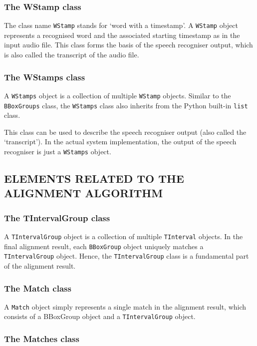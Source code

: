 \documentclass[12pt]{article}
\begin{document}
\subsubsection{The WStamp class}

The class name \texttt{WStamp} stands for `word with a timestamp'. A \texttt{WStamp} object represents a recognised word and the associated starting timestamp as in the input audio file. This class forms the basis of the speech recogniser output, which is also called the transcript of the audio file. 

\subsubsection{The WStamps class}

A \texttt{WStamps} object is a collection of multiple \texttt{WStamp} objects. Similar to the \texttt{BBoxGroups} class, the \texttt{WStamps} class also inherits from the Python built-in \texttt{list} class.

This class can be used to describe the speech recogniser output (also called the `transcript'). In the actual system implementation, the output of the speech recogniser is just a \texttt{WStamps} object.

\subsection{ELEMENTS RELATED TO THE ALIGNMENT ALGORITHM}

\subsubsection{The TIntervalGroup class}

A \texttt{TIntervalGroup} object is a collection of multiple \texttt{TInterval} objects. In the final alignment result, each \texttt{BBoxGroup} object uniquely matches a \texttt{TIntervalGroup} object. Hence, the \texttt{TIntervalGroup} class is a fundamental part of the alignment result.

\subsubsection{The Match class}

A \texttt{Match} object simply represents a single match in the alignment result, which consists of a {BBoxGroup} object and a \texttt{TIntervalGroup} object. 

\subsubsection{The Matches class}
\label{sec:basic-elem-matches}
\end{document}
